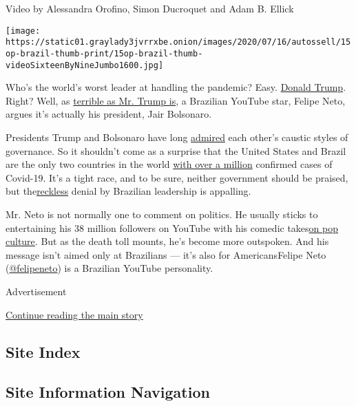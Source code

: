 Video by Alessandra Orofino, Simon Ducroquet and Adam B. Ellick

\texttt{[image: https://static01.graylady3jvrrxbe.onion/images/2020/07/16/autossell/15op-brazil-thumb-print/15op-brazil-thumb-videoSixteenByNineJumbo1600.jpg]}

Who's the world's worst leader at handling the pandemic? Easy.
\href{https://www.nytimes3xbfgragh.onion/2020/07/28/technology/virus-video-trump.html}{Donald
Trump}. Right? Well, as
\href{https://www.cnn.com/2020/07/10/politics/abc-ipsos-poll-trump-coronavirus/index.html}{terrible
as Mr. Trump is}, a Brazilian YouTube star, Felipe Neto, argues it's
actually his president, Jair Bolsonaro.

Presidents Trump and Bolsonaro have long
\href{https://www.nbcnews.com/news/latino/trump-praises-brazil-s-far-right-president-white-house-n985116}{admired}
each other's caustic styles of governance. So it shouldn't come as a
surprise that the United States and Brazil are the only two countries in
the world
\href{https://www.nytimes3xbfgragh.onion/2020/06/19/world/coronavirus-live-updates.html}{with
over a million} confirmed cases of Covid-19. It's a tight race, and to
be sure, neither government should be praised, but
the\href{https://www.cnn.com/2020/06/19/americas/brazil-one-million-coronavirus-jair-bolsonaro-cases-intl/index.html}{reckless}
denial by Brazilian leadership is appalling.

Mr. Neto is not normally one to comment on politics. He usually sticks
to entertaining his 38 million followers on YouTube with his comedic
takes\href{https://www.youtube.com/watch?v=tgxw_0r0s20}{on pop culture}.
But as the death toll mounts, he's become more outspoken. And his
message isn't aimed only at Brazilians --- it's also for AmericansFelipe
Neto (\href{https://twitter.com/felipeneto}{@felipeneto}) is a Brazilian
YouTube personality.

Advertisement

\protect\hyperlink{after-bottom}{Continue reading the main story}

\hypertarget{site-index}{%
\subsection{Site Index}\label{site-index}}

\hypertarget{site-information-navigation}{%
\subsection{Site Information
Navigation}\label{site-information-navigation}}

